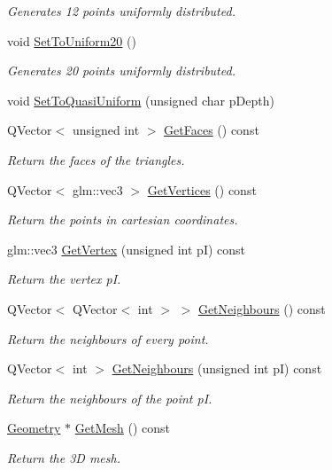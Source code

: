 \begin{DoxyCompactItemize}
\begin{DoxyCompactList}\small\item\em Generates 12 points uniformly distributed. \end{DoxyCompactList}\item 
void \hyperlink{class_sphere_point_cloud_a22f25a4447052eb8c98dea4ace790c8b}{Set\+To\+Uniform20} ()
\begin{DoxyCompactList}\small\item\em Generates 20 points uniformly distributed. \end{DoxyCompactList}\item 
void \hyperlink{class_sphere_point_cloud_a1eff636a5b32f0951a33a9cf7598c1d9}{Set\+To\+Quasi\+Uniform} (unsigned char p\+Depth)
\item 
Q\+Vector$<$ unsigned int $>$ \hyperlink{class_sphere_point_cloud_a381347a4f912ecc8d2012086324e0d56}{Get\+Faces} () const 
\begin{DoxyCompactList}\small\item\em Return the faces of the triangles. \end{DoxyCompactList}\item 
Q\+Vector$<$ glm\+::vec3 $>$ \hyperlink{class_sphere_point_cloud_aa3cd921f38a53c64d3fb4833860fbd9c}{Get\+Vertices} () const 
\begin{DoxyCompactList}\small\item\em Return the points in cartesian coordinates. \end{DoxyCompactList}\item 
glm\+::vec3 \hyperlink{class_sphere_point_cloud_a4e076465c1f7f26970794e4c0f8e8adb}{Get\+Vertex} (unsigned int p\+I) const 
\begin{DoxyCompactList}\small\item\em Return the vertex {\itshape p\+I}. \end{DoxyCompactList}\item 
Q\+Vector$<$ Q\+Vector$<$ int $>$ $>$ \hyperlink{class_sphere_point_cloud_a0004a4d225831127eaafaa28dc13b416}{Get\+Neighbours} () const 
\begin{DoxyCompactList}\small\item\em Return the neighbours of every point. \end{DoxyCompactList}\item 
Q\+Vector$<$ int $>$ \hyperlink{class_sphere_point_cloud_ac83eb3eac8c51a2bbec28ff2a40a985c}{Get\+Neighbours} (unsigned int p\+I) const 
\begin{DoxyCompactList}\small\item\em Return the neighbours of the point {\itshape p\+I}. \end{DoxyCompactList}\item 
\hyperlink{class_geometry}{Geometry} $\ast$ \hyperlink{class_sphere_point_cloud_afb0abeffb85e483961fd08a7e58e3440}{Get\+Mesh} () const 
\begin{DoxyCompactList}\small\item\em Return the 3\+D mesh. \end{DoxyCompactList}\end{DoxyCompactItemize}

